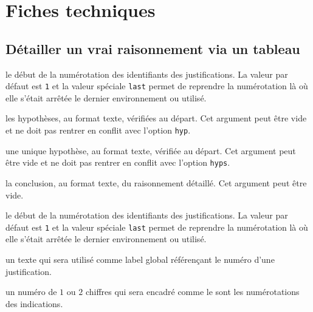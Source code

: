 \documentclass[12pt,a4paper]{article}
\begin{document}

\section{Fiches techniques}

\subsection{Détailler un \og vrai \fg{} raisonnement via un tableau}


 le début de la numérotation des identifiants des justifications.
              La valeur par défaut est \verb+1+ et la valeur spéciale \verb+last+ permet de reprendre la numérotation là où elle s'était arrêtée le dernier environnement  ou  utilisé.

 les hypothèses, au format texte, vérifiées au départ.
              Cet argument peut être vide et ne doit pas rentrer en conflit avec l'option \verb+hyp+.

 une unique hypothèse, au format texte, vérifiée au départ.
              Cet argument peut être vide et ne doit pas rentrer en conflit avec l'option \verb+hyps+.

 la conclusion, au format texte, du raisonnement détaillé.
              Cet argument peut être vide.


\separation



 le début de la numérotation des identifiants des justifications.
              La valeur par défaut est \verb+1+ et la valeur spéciale \verb+last+ permet de reprendre la numérotation là où elle s'était arrêtée le dernier environnement  ou  utilisé.


\separation



\IDoption{} un texte qui sera utilisé comme label global référençant le numéro d'une justification.


\separation


  \hfill {}

\IDarg{} un numéro de $1$ ou $2$ chiffres qui sera encadré comme le sont les numérotations des indications.
\end{document}
